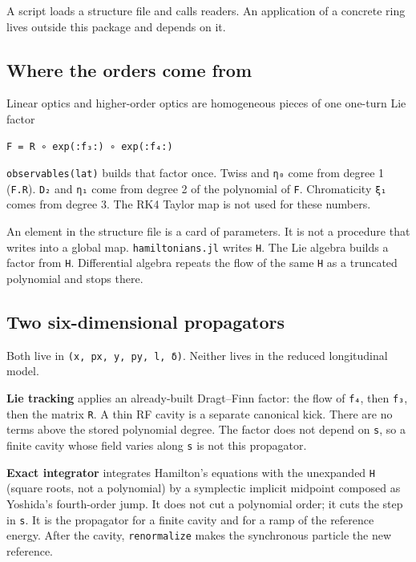 \documentclass[11pt,a4paper]{article}
\begin{document}
A script loads a structure file and calls readers. An application of a
concrete ring lives outside this package and depends on it.

\subsection{Where the orders come from}

Linear optics and higher-order optics are homogeneous pieces of one
one-turn Lie factor

\begin{verbatim}
F = R ∘ exp(:f₃:) ∘ exp(:f₄:)
\end{verbatim}

\texttt{observables(lat)} builds that factor once. Twiss and \texttt{η₀} come from
degree 1 (\texttt{F.R}). \texttt{D₂} and \texttt{η₁} come from degree 2 of the polynomial of
\texttt{F}. Chromaticity \texttt{ξ₁} comes from degree 3. The RK4 Taylor map is not
used for these numbers.

An element in the structure file is a card of parameters. It is not a
procedure that writes into a global map. \texttt{hamiltonians.jl} writes \texttt{H}.
The Lie algebra builds a factor from \texttt{H}. Differential algebra repeats
the flow of the same \texttt{H} as a truncated polynomial and stops there.

\subsection{Two six-dimensional propagators}

Both live in \texttt{(x, px, y, py, l, δ)}. Neither lives in the reduced
longitudinal model.

\textbf{Lie tracking} applies an already-built Dragt–Finn factor: the flow of
\texttt{f₄}, then \texttt{f₃}, then the matrix \texttt{R}. A thin RF cavity is a separate
canonical kick. There are no terms above the stored polynomial degree.
The factor does not depend on \texttt{s}, so a finite cavity whose field varies
along \texttt{s} is not this propagator.

\textbf{Exact integrator} integrates Hamilton's equations with the unexpanded
\texttt{H} (square roots, not a polynomial) by a symplectic implicit midpoint
composed as Yoshida's fourth-order jump. It does not cut a polynomial
order; it cuts the step in \texttt{s}. It is the propagator for a finite cavity
and for a ramp of the reference energy. After the cavity,
\texttt{renormalize} makes the synchronous particle the new reference.
\end{document}
